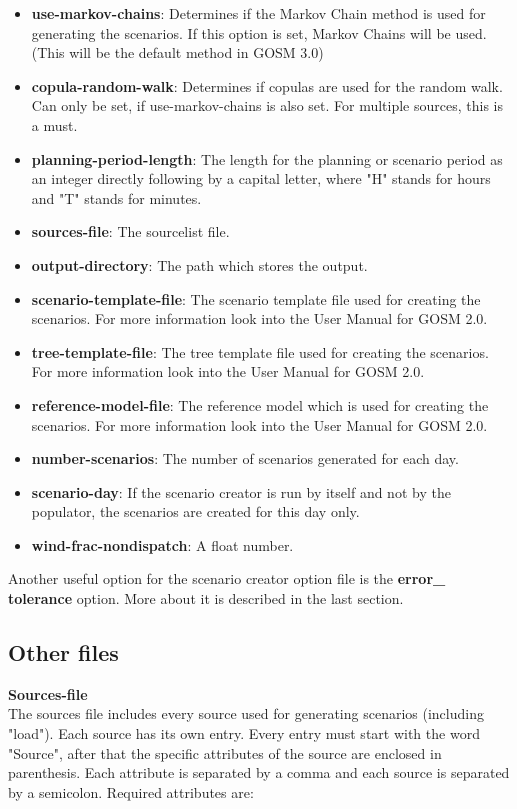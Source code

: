 \begin{itemize}
	\item \textbf{use-markov-chains}: Determines if the Markov Chain method is used for generating the scenarios. If this option is set, Markov Chains will be used. (This will be the default method in GOSM 3.0)
	\item \textbf{copula-random-walk}: Determines if copulas are used for the random walk. Can only be set, if use-markov-chains is also set. For multiple sources, this is a must.
	\item \textbf{planning-period-length}: The length for the planning or scenario period as an integer directly following by a capital letter, where "H" stands for hours and "T" stands for minutes.
	\item \textbf{sources-file}: The sourcelist file.
	\item \textbf{output-directory}: The path which stores the output.
	\item \textbf{scenario-template-file}: The scenario template file  used for creating the scenarios. For more information look into the User Manual for GOSM 2.0.
	\item \textbf{tree-template-file}: The tree template file used for creating the scenarios. For more information look into the User Manual for GOSM 2.0.
	\item \textbf{reference-model-file}: The reference model which is used for creating the scenarios. For more information look into the User Manual for GOSM 2.0.
	\item \textbf{number-scenarios}: The number of scenarios generated for each day.
	\item \textbf{scenario-day}: If the scenario creator is run by itself and not by the populator, the scenarios are created for this day only. 
	\item \textbf{wind-frac-nondispatch}: A float number.
\end{itemize}

Another useful option for the scenario creator option file is the \textbf{error\_ tolerance} option. More about it is described in the last section.

\subsection{Other files}

\textbf{Sources-file} \\

The sources file includes every source used for generating scenarios (including "load"). Each source has its own entry. Every entry must start with the word "Source", after that the specific attributes of the source are enclosed in parenthesis. Each attribute is separated by a comma and each source is separated by a semicolon. Required attributes are:

